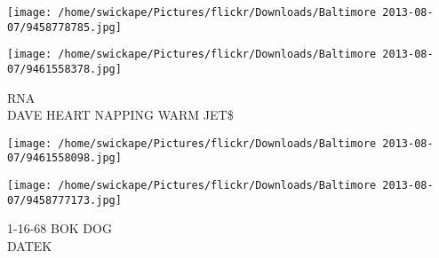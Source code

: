 \documentclass[10pt,letterpaper]{article}
\begin{document}
\texttt{[image: /home/swickape/Pictures/flickr/Downloads/Baltimore 2013-08-07/9458778785.jpg]}

\vspace{0.25in}
\texttt{[image: /home/swickape/Pictures/flickr/Downloads/Baltimore 2013-08-07/9461558378.jpg]}

RNA\\
DAVE HEART NAPPING WARM JET\$
\pagebreak

\texttt{[image: /home/swickape/Pictures/flickr/Downloads/Baltimore 2013-08-07/9461558098.jpg]}

\vspace{0.25in}
\texttt{[image: /home/swickape/Pictures/flickr/Downloads/Baltimore 2013-08-07/9458777173.jpg]}

1{-}16{-}68 BOK DOG\\
DATEK
\pagebreak
\end{document}
